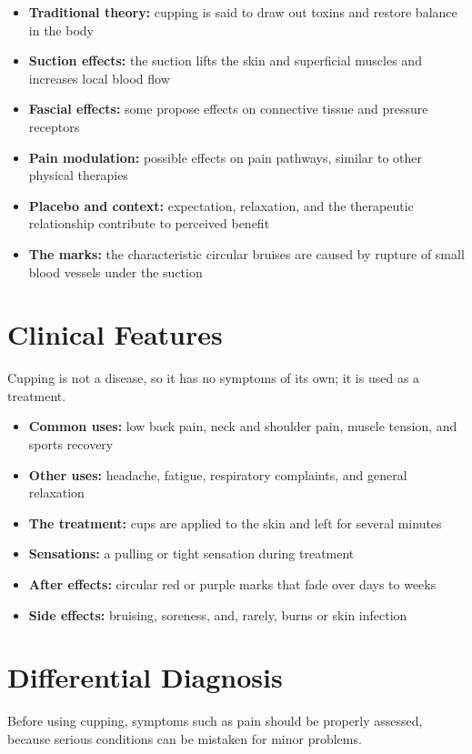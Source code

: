 \begin{itemize}
    \item \textbf{Traditional theory:} cupping is said to draw out toxins and restore balance in the body
    \item \textbf{Suction effects:} the suction lifts the skin and superficial muscles and increases local blood flow
    \item \textbf{Fascial effects:} some propose effects on connective tissue and pressure receptors
    \item \textbf{Pain modulation:} possible effects on pain pathways, similar to other physical therapies
    \item \textbf{Placebo and context:} expectation, relaxation, and the therapeutic relationship contribute to perceived benefit
    \item \textbf{The marks:} the characteristic circular bruises are caused by rupture of small blood vessels under the suction
\end{itemize}

\section*{Clinical Features}
Cupping is not a disease, so it has no symptoms of its own; it is used as a treatment.

\begin{itemize}
    \item \textbf{Common uses:} low back pain, neck and shoulder pain, muscle tension, and sports recovery
    \item \textbf{Other uses:} headache, fatigue, respiratory complaints, and general relaxation
    \item \textbf{The treatment:} cups are applied to the skin and left for several minutes
    \item \textbf{Sensations:} a pulling or tight sensation during treatment
    \item \textbf{After effects:} circular red or purple marks that fade over days to weeks
    \item \textbf{Side effects:} bruising, soreness, and, rarely, burns or skin infection
\end{itemize}

\section*{Differential Diagnosis}
Before using cupping, symptoms such as pain should be properly assessed, because serious conditions can be mistaken for minor problems.

